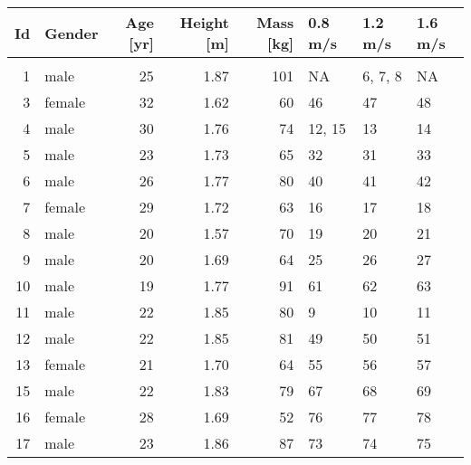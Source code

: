 \begin{tabular}{rlrrrlll}
\toprule
 Id &  Gender &  Age [yr] & Height [m] & Mass [kg] & 0.8 m/s &  1.2 m/s & 1.6 m/s \\
\midrule
    &         &           &            &           &         &          &         \\
  1 &    male &        25 &       1.87 &       101 &      NA &  6, 7, 8 &      NA \\
  3 &  female &        32 &       1.62 &        60 &      46 &       47 &      48 \\
  4 &    male &        30 &       1.76 &        74 &  12, 15 &       13 &      14 \\
  5 &    male &        23 &       1.73 &        65 &      32 &       31 &      33 \\
  6 &    male &        26 &       1.77 &        80 &      40 &       41 &      42 \\
  7 &  female &        29 &       1.72 &        63 &      16 &       17 &      18 \\
  8 &    male &        20 &       1.57 &        70 &      19 &       20 &      21 \\
  9 &    male &        20 &       1.69 &        64 &      25 &       26 &      27 \\
 10 &    male &        19 &       1.77 &        91 &      61 &       62 &      63 \\
 11 &    male &        22 &       1.85 &        80 &       9 &       10 &      11 \\
 12 &    male &        22 &       1.85 &        81 &      49 &       50 &      51 \\
 13 &  female &        21 &       1.70 &        64 &      55 &       56 &      57 \\
 15 &    male &        22 &       1.83 &        79 &      67 &       68 &      69 \\
 16 &  female &        28 &       1.69 &        52 &      76 &       77 &      78 \\
 17 &    male &        23 &       1.86 &        87 &      73 &       74 &      75 \\
\bottomrule
\end{tabular}
